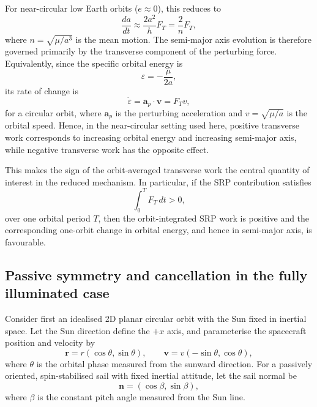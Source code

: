 \vspace{0.5em}
\par\noindent For near-circular low Earth orbits ($e\approx 0$), this reduces to
\begin{equation}
\frac{da}{dt} \approx \frac{2a^2}{h}F_T = \frac{2}{n}F_T,
\label{eq:da_circular}
\end{equation}
where $n=\sqrt{\mu/a^3}$ is the mean motion. The semi-major axis evolution is therefore governed primarily by the transverse component of the perturbing force. Equivalently, since the specific orbital energy is
\begin{equation}
\varepsilon = -\frac{\mu}{2a},
\end{equation}
its rate of change is
\begin{equation}
\dot{\varepsilon} = \mathbf{a}_{p}\cdot\mathbf{v} = F_T v,
\label{eq:energy_rate}
\end{equation}
for a circular orbit, where $\mathbf{a}_{p}$ is the perturbing acceleration and $v=\sqrt{\mu/a}$ is the orbital speed. Hence, in the near-circular setting used here, positive transverse work corresponds to increasing orbital energy and increasing semi-major axis, while negative transverse work has the opposite effect.

\vspace{0.5em}
\par\noindent This makes the sign of the orbit-averaged transverse work the central quantity of interest in the reduced mechanism. In particular, if the SRP contribution satisfies
\begin{equation}
\int_0^T F_T\,dt > 0,
\end{equation}
over one orbital period \(T\), then the orbit-integrated SRP work is positive and the corresponding one-orbit change in orbital energy, and hence in semi-major axis, is favourable.

\vspace{0.5em}
\subsection{\textbf{Passive symmetry and cancellation in the fully illuminated case}}

\noindent Consider first an idealised 2D planar circular orbit with the Sun fixed in inertial space. Let the Sun direction define the $+x$ axis, and parameterise the spacecraft position and velocity by
\begin{equation}
\mathbf{r}=r(\cos\theta,\sin\theta), \qquad
\mathbf{v}=v(-\sin\theta,\cos\theta),
\end{equation}
where $\theta$ is the orbital phase measured from the sunward direction. For a passively oriented, spin-stabilised sail with fixed inertial attitude, let the sail normal be
\begin{equation}
\mathbf{n}=(\cos\beta,\sin\beta),
\end{equation}
where $\beta$ is the constant pitch angle measured from the Sun line.

